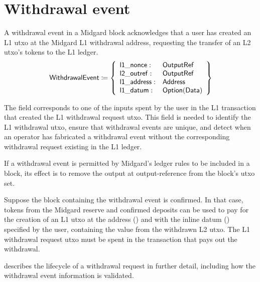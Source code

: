 \documentclass[../midgard.tex]{subfiles}
\begin{document}
\section{Withdrawal event}
\label{h:withdrawal-event}

A withdrawal event in a Midgard block acknowledges that a user has created an L1 utxo at the Midgard L1 withdrawal address, requesting the transfer of an L2 utxo's tokens to the L1 ledger.
\begin{equation*}
    \mathsf{WithdrawalEvent} \coloneq \left\{
    \begin{array}{ll}
        \mathsf{l1\_nonce} : & \mathsf{OutputRef} \\
        \mathsf{l2\_outref} :& \mathsf{OutputRef} \\
        \mathsf{l1\_address} : & \mathsf{Address} \\
        \mathsf{l1\_datum} : & \mathsf{Option(Data)}
    \end{array} \right\}
\end{equation*}

The  field corresponds to one of the inputs spent by the user in the L1 transaction that created the L1 withdrawal request utxo.
This field is needed to identify the L1 withdrawal utxo, ensure that withdrawal events are unique, and detect when an operator has fabricated a withdrawal event without the corresponding withdrawal request existing in the L1 ledger.

If a withdrawal event is permitted by Midgard's ledger rules to be included in a block, its effect is to remove the output at output-reference  from the block's utxo set.

Suppose the block containing the withdrawal event is confirmed.
In that case, tokens from the Midgard reserve and confirmed deposits can be used to pay for the creation of an L1 utxo at the address () and with the inline datum () specified by the user, containing the value from the withdrawn L2 utxo.
The L1 withdrawal request utxo must be spent in the transaction that pays out the withdrawal.

 describes the lifecycle of a withdrawal request in further detail, including how the withdrawal event information is validated.
\end{document}
